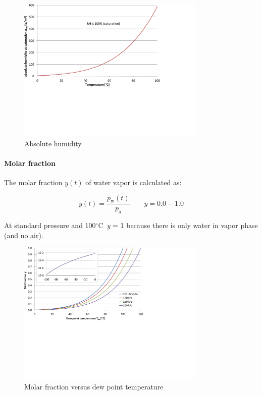 \documentclass[11pt,a4paper,english,twoside]{scrreprt}
\newcommand{\gradC}{${}^\circ$C}      %
\begin{document}
\begin{figure}
  \centering
  \includegraphics*[width=0.8\textwidth,angle=0]{FCF_Diag_a.pdf}
  \caption[Absolute humidity]{Absolute humidity}
\end{figure}

\paragraph{Molar fraction}

The molar fraction $y(t)$ of water vapor is calculated as:

\[y(t)=\frac{p_\text{w}(t)}{p_\text{a}} \qquad y=0.0-1.0\]


At standard pressure and 100\gradC\ \textit{y} = 1 because there is only water in vapor phase (and no air).

\begin{figure}
  \centering
  \includegraphics*[width=0.8\textwidth,angle=0]{FCF_Diag_mol_y.pdf}
  \caption[Molar fraction versus dew point temperature]{Molar fraction versus dew point temperature}
\end{figure}
\end{document}
